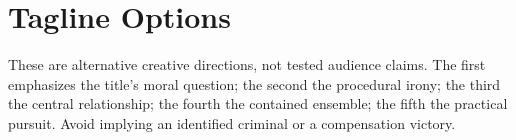 \section{Tagline Options}
These are alternative creative directions, not tested audience claims. The first emphasizes the title's moral question; the second the procedural irony; the third the central relationship; the fourth the contained ensemble; the fifth the practical pursuit. Avoid implying an identified criminal or a compensation victory.
